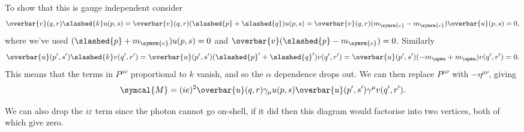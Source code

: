 \documentclass[fleqn]{NotesClass}
\newcommand{\minkowskiMetric}{\eta}
\newcommand{\amplitude}{\symcal{M}}
\newcommand{\diracadjoint}[1]{\overbar{#1}}
\begin{document}
    To show that this is gauge independent consider
    \begin{equation}
        \diracadjoint{v}(q, r) \slashed{k} u(p, s) = \diracadjoint{v}(q, r)(\slashed{p} + \slashed{q})u(p, s) = \diracadjoint{v}(q, r)(m_{\symrm{e}} - m_{\symrm{e}})\diracadjoint{u}(p, s) = 0,
    \end{equation}
    where we've used \((\slashed{p} + m_{\symrm{e}})u(p, s) = 0\) and \(\diracadjoint{v}(\slashed{p} - m_{\symrm{e}}) = 0\).
    Similarly
    \begin{equation*}
        \diracadjoint{u}(p', s') \slashed{k} v(q', r') = \diracadjoint{u}(p', s') (\slashed{p}' + \slashed{q}') v(q', r') = \diracadjoint{u}(p', s')(-m_{\upmu} + m_{\upmu}) v(q', r') = 0.
    \end{equation*}
    This means that the terms in \(P^{\mu\nu}\) proportional to \(k\) vanish, and so the \(\alpha\) dependence drops out.
    We can then replace \(P^{\mu\nu}\) with \(-\minkowskiMetric^{\mu\nu}\), giving
    \begin{equation}
        \amplitude = (ie)^2 \diracadjoint{u}(q, r) \gamma_\mu u(p, s) \diracadjoint{u}(p', s') \gamma^\mu v(q', r').
    \end{equation}
    
    We can also drop the \(i\varepsilon\) term since the photon cannot go on-shell, if it did then this diagram would factorise into two vertices, both of which give zero.
    
\end{document}
